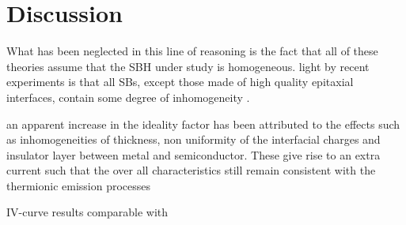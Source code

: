 \section{Discussion}
What has been neglected in this line of reasoning is the fact that all of these theories assume that the SBH under study is homogeneous.
light by recent experiments is that all SBs, except those made of high quality epitaxial interfaces,
contain some degree of inhomogeneity \cite{tung_recent_2001}.

an apparent increase in
the ideality factor has been attributed to the effects
such as inhomogeneities of thickness, non uniformity of
the interfacial charges and insulator layer between
metal and semiconductor. These give rise to an extra
current such that the over all characteristics still
remain consistent with the thermionic emission
processes \cite{dhimmar_analysis_2016}

IV-curve results comparable with \cite{dhimmar_analysis_2016}